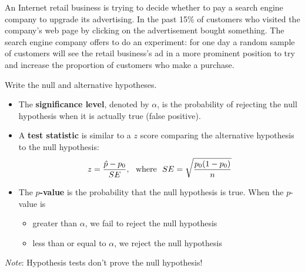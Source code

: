 \documentclass[../mathNotesPreamble]{subfiles}
\begin{document}
    \begin{ex*}
      An Internet retail business is trying to decide whether to pay a search engine company to upgrade its advertising. In the past 15\% of customers who visited the company's web page by clicking on the advertisement bought something. %
      The search engine company offers to do an experiment: for one day a random sample of customers will see the retail business's ad in a more prominent position to try and increase the proportion of customers who make a purchase.

      Write the null and alternative hypotheses.
    \end{ex*}
    \pagebreak

    \begin{defn*}
      \begin{itemize}
        \item The \textbf{significance level}, denoted by $\alpha$, is the probability of rejecting the null hypothesis when it is actually true (false positive).
        \item A \textbf{test statistic} is similar to a $z$ score comparing the alternative hypothesis to the null hypothesis:
          \[z=\frac{\hat{p}-p_0}{SE},\ \textnormal{ where }\  SE=\sqrt{\frac{p_0(1-p_0)}{n}}\]
        \item The \textbf{$p$-value} is the probability that the null hypothesis is true. When the $p$-value is
          \begin{itemize}
            \item greater than $\alpha$, we fail to reject the null hypothesis
            \item less than or equal to $\alpha$, we reject the null hypothesis
          \end{itemize}
      \end{itemize}
      \emph{Note}: Hypothesis tests don't prove the null hypothesis!
    \end{defn*}
\end{document}
